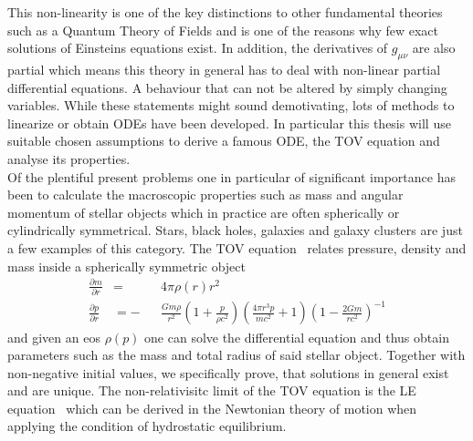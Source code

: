 This non-linearity is one of the key distinctions to other fundamental theories such as a Quantum Theory of Fields and is one of the reasons why few exact solutions of Einsteins equations exist.
In addition, the derivatives of $g_{\mu\nu}$ are also partial which means this theory in general has to deal with non-linear partial differential equations.
A behaviour that can not be altered by simply changing variables.
While these statements might sound demotivating, lots of methods to linearize or obtain \acp{ODE} have been developed.
In particular this thesis will use suitable chosen assumptions to derive a famous \ac{ODE}, the \ac{TOV} equation and analyse its properties.\\
Of the plentiful present problems one in particular of significant importance has been to calculate the macroscopic properties such as mass and angular momentum of stellar objects which in practice are often spherically or cylindrically symmetrical.
Stars, black holes, galaxies and galaxy clusters are just a few examples of this category.
The \ac{TOV} equation~\cite{tolmanStaticSolutionsEinstein1939, oppenheimerMassiveNeutronCores1939} relates pressure, density and mass inside a spherically symmetric object
\begin{equation}
	\begin{aligned}
			\frac{\partial m}{\partial r} &= &&4\pi\rho(r)r^2\\
			\frac{\partial p}{\partial r} &= -&&\frac{Gm\rho}{r^2}\left(1+\frac{p}{\rho c^2}\right)\left(\frac{4\pi r^3 p}{mc^2}+1\right)\left(1-\frac{2Gm}{rc^2}\right)^{-1}
			\label{eq:01-Intr-TOV-Equation}
	\end{aligned}
\end{equation}
and given an \ac{eos} $\rho(p)$ one can solve the differential equation and thus obtain parameters such as the mass and total radius of said stellar object.
Together with non-negative initial values, we specifically prove, that solutions in general exist and are unique.
The non-relativisitc limit of the \ac{TOV} equation is the \ac{LE} equation~\cite{laneTheoreticalTemperatureSun1870, emdenGaskugeln1907} which can be derived in the Newtonian theory of motion when applying the condition of hydrostatic equilibrium.
